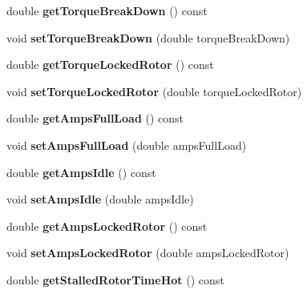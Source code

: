\begin{DoxyCompactItemize}
double {\bfseries get\+Torque\+Break\+Down} () const
\item 
\mbox{\label{class_motor_data_a7df7b610bdaf5681a5743b6c8c0f0113}} 
void {\bfseries set\+Torque\+Break\+Down} (double torque\+Break\+Down)
\item 
\mbox{\label{class_motor_data_a925ec8dd6c6211d3ed17eaf59a2b8d3a}} 
double {\bfseries get\+Torque\+Locked\+Rotor} () const
\item 
\mbox{\label{class_motor_data_abe381700b30c5c32cb321f549d00072b}} 
void {\bfseries set\+Torque\+Locked\+Rotor} (double torque\+Locked\+Rotor)
\item 
\mbox{\label{class_motor_data_afd764373f8aa8bfb0b5fd16cca6915b7}} 
double {\bfseries get\+Amps\+Full\+Load} () const
\item 
\mbox{\label{class_motor_data_ab57791b83a54024d08e7586fd271f8c3}} 
void {\bfseries set\+Amps\+Full\+Load} (double amps\+Full\+Load)
\item 
\mbox{\label{class_motor_data_a39f6771f83dbd65ae245f99b139a785a}} 
double {\bfseries get\+Amps\+Idle} () const
\item 
\mbox{\label{class_motor_data_ad59e05e9d308b797eb557714c7f24187}} 
void {\bfseries set\+Amps\+Idle} (double amps\+Idle)
\item 
\mbox{\label{class_motor_data_a22917cf90eadc0da1e966257600f5631}} 
double {\bfseries get\+Amps\+Locked\+Rotor} () const
\item 
\mbox{\label{class_motor_data_a65c396ebcd810ce77c5201c19fcfaa81}} 
void {\bfseries set\+Amps\+Locked\+Rotor} (double amps\+Locked\+Rotor)
\item 
\mbox{\label{class_motor_data_aede27e2ea96b57b0c11dd092801868c6}} 
double {\bfseries get\+Stalled\+Rotor\+Time\+Hot} () const
\item 
\mbox{\label{class_motor_data_a18cc65247e2e51cebe93faaceec44642}} 

\end{DoxyCompactItemize}
